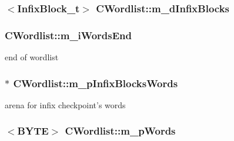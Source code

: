 \hypertarget{classCWordlist_a86a597d2bc66b2e016f4e978f5be458b}{
\subsubsection[{m\-\_\-d\-Infix\-Blocks}]{$<${\bf Infix\-Block\-\_\-t}$>$ C\-Wordlist\-::m\-\_\-d\-Infix\-Blocks}}\label{classCWordlist_a86a597d2bc66b2e016f4e978f5be458b}
\hypertarget{classCWordlist_a3b018fb3c0a440481a2a7d1f7bec851d}{
\subsubsection[{m\-\_\-i\-Words\-End}]{ C\-Wordlist\-::m\-\_\-i\-Words\-End}}\label{classCWordlist_a3b018fb3c0a440481a2a7d1f7bec851d}


end of wordlist 

\hypertarget{classCWordlist_ac857c9efec46e02df54da78b8215491d}{
\subsubsection[{m\-\_\-p\-Infix\-Blocks\-Words}]{$\ast$ C\-Wordlist\-::m\-\_\-p\-Infix\-Blocks\-Words}}\label{classCWordlist_ac857c9efec46e02df54da78b8215491d}


arena for infix checkpoint's words 

\hypertarget{classCWordlist_a6079074dc4ddc2b9fd8bd380fe0b811e}{
\subsubsection[{m\-\_\-p\-Words}]{$<${\bf B\-Y\-T\-E}$>$ C\-Wordlist\-::m\-\_\-p\-Words}}\label{classCWordlist_a6079074dc4ddc2b9fd8bd380fe0b811e}


